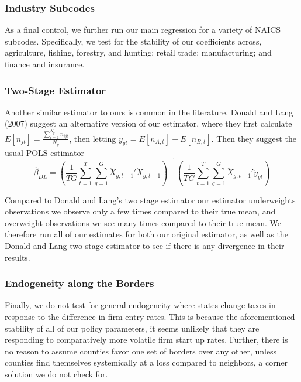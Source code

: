 \subsubsection{Industry Subcodes}
As a final control, we further run our main regression for a variety of NAICS subcodes. Specifically, we test for the stability of our coefficients across, agriculture, fishing, forestry, and hunting; retail trade; manufacturing; and finance and insurance.


\subsubsection{Two-Stage Estimator}
Another similar estimator to ours is common in the literature. Donald and Lang (2007) suggest an alternative version of our estimator, where they first calculate $E[n_{jt}] = \frac{\sum_{i=1}^{N_{g}}n_{ijt}}{N_{g}}$, then letting $\ddot y_{gt} = E[n_{A,t}]-E[n_{B,t}]$. Then they suggest the usual POLS estimator
\begin{equation}\label{dl}
\hat \beta_{DL} = \left(\frac{1}{TG} \sum_{t=1}^{T}\sum_{g=1}^{G}\ddot X_{g,t-1}'\ddot X_{g,t-1}\right)^{-1}\left(\frac{1}{TG}\sum_{t=1}^{T}\sum_{g=1}^{G}\ddot X_{g,t-1}'\ddot y_{gt}\right)
\end{equation}

Compared to Donald and Lang's two stage estimator our estimator underweights observations we observe only a few times compared to their true mean, and overweight observations we see many times compared to their true mean. We therefore run all of our estimates for both our original estimator, as well as the Donald and Lang two-stage estimator to see if there is any divergence in their results.


\subsubsection{Endogeneity along the Borders}
Finally, we do not test for general endogeneity where states change taxes in response to the difference in firm entry rates. This is because the aforementioned stability of all of our policy parameters, it seems unlikely that they are responding to comparatively more volatile firm start up rates. Further, there is no reason to assume counties favor one set of borders over any other, unless counties find themselves systemically at a loss compared to neighbors, a corner solution we do not check for.


